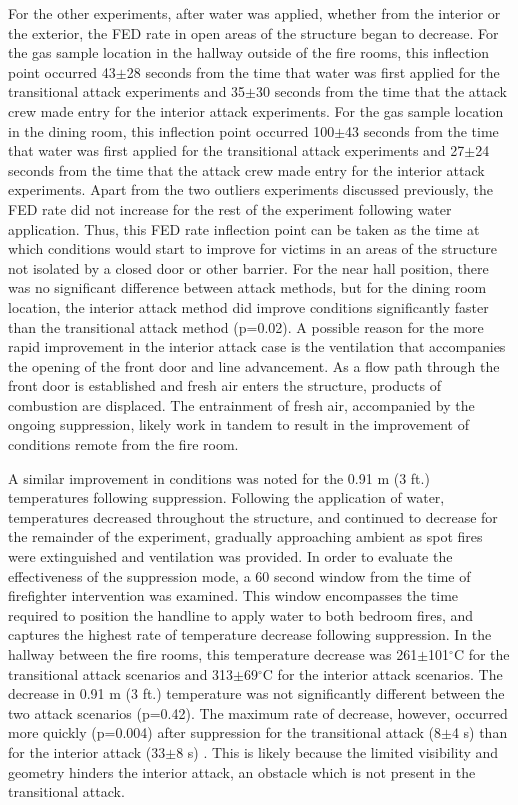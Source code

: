 \documentclass[12pt,oneside]{article}
\begin{document}
For the other experiments, after water was applied, whether from the interior or the exterior, the FED rate in open areas of the structure began to decrease. For the gas sample location in the hallway outside of the fire rooms, this inflection point occurred 43$\pm$28 seconds from the time that water was first applied for the transitional attack experiments and 35$\pm$30 seconds from the time that the attack crew made entry for the interior attack experiments. For the gas sample location in the dining room, this inflection point occurred 100$\pm$43 seconds from the time that water was first applied for the transitional attack experiments and 27$\pm$24 seconds from the time that the attack crew made entry for the interior attack experiments. Apart from the two outliers experiments discussed previously, the FED rate did not increase for the rest of the experiment following water application. Thus, this FED rate inflection point can be taken as the time at which conditions would start to improve for victims in an areas of the structure not isolated by a closed door or other barrier. For the near hall position, there was no significant difference between attack methods, but for the dining room location, the interior attack method did improve conditions significantly faster than the transitional attack method (p=0.02). A possible reason for the more rapid improvement in the interior attack case is the ventilation that accompanies the opening of the front door and line advancement. As a flow path through the front door is established and fresh air enters the structure, products of combustion are displaced. The entrainment of fresh air, accompanied by the ongoing suppression, likely work in tandem to result in the improvement of conditions remote from the fire room. 

A similar improvement in conditions was noted for the 0.91 m (3 ft.) temperatures following suppression. Following the application of water, temperatures decreased throughout the structure, and continued to decrease for the remainder of the experiment, gradually approaching ambient as spot fires were extinguished and ventilation was provided. In order to evaluate the effectiveness of the suppression mode, a 60 second window from the time of firefighter intervention was examined. This window encompasses the time required to position the handline to apply water to both bedroom fires, and captures the highest rate of temperature decrease following suppression. In the hallway between the fire rooms, this temperature decrease was 261$\pm$101$^{\circ}$C for the transitional attack scenarios and 313$\pm$69$^{\circ}$C for the interior attack scenarios. The decrease in 0.91 m (3 ft.) temperature was not significantly different between the two attack scenarios (p=0.42). The maximum rate of decrease, however, occurred more quickly (p=0.004) after suppression for the transitional attack (8$\pm$4 s) than for the interior attack (33$\pm$8 s) . This is likely because the limited visibility and geometry hinders the interior attack, an obstacle which is not present in the transitional attack. 
\end{document}
